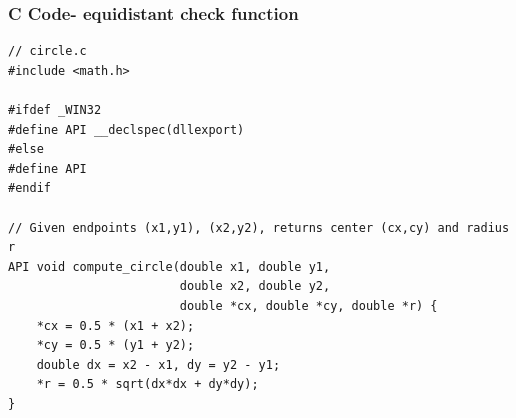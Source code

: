 \documentclass{beamer}
\begin{document}
	\begin{frame}[fragile]
	\frametitle{C Code- equidistant check function }
	
	\begin{lstlisting}
// circle.c
#include <math.h>

#ifdef _WIN32
#define API __declspec(dllexport)
#else
#define API
#endif

// Given endpoints (x1,y1), (x2,y2), returns center (cx,cy) and radius r
API void compute_circle(double x1, double y1,
                        double x2, double y2,
                        double *cx, double *cy, double *r) {
    *cx = 0.5 * (x1 + x2);
    *cy = 0.5 * (y1 + y2);
    double dx = x2 - x1, dy = y2 - y1;
    *r = 0.5 * sqrt(dx*dx + dy*dy);
}
	\end{lstlisting}
\end{frame}
\end{document}
